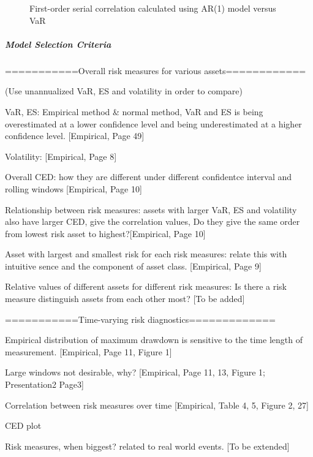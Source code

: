 \documentclass[11pt]{article}
\begin{document}
\begin{figure}[H]
\begin{minipage}[b]{0.48\textwidth}
    \caption{First-order serial correlation calculated using AR(1) model versus VaR}
    \label{fig:SerCol-VaR5yrAR1}
  \end{minipage}
\end{figure}

\subparagraph{Model Selection Criteria}




\newpage









\clearpage


===========Overall risk measures for various assets============

(Use unannualized VaR, ES and volatility in order to compare)

VaR, ES: Empirical method \& normal method, VaR and ES is being overestimated at a lower confidence level and being underestimated at a higher confidence level. [Empirical, Page 49]

Volatility: [Empirical, Page 8]

Overall CED: how they are different under different confidentce interval and rolling windows [Empirical, Page 10]

Relationship between risk measures: assets with larger VaR, ES and volatility also have larger CED, give the correlation values, Do they give the same order from lowest risk asset to highest?[Empirical, Page 10]

Asset with largest and smallest risk for each risk measures: relate this with intuitive sence and the component of asset class. [Empirical, Page 9]

Relative values of different assets for different risk measures: Is there a risk measure distinguish assets from each other most? [To be added]


===========Time-varying risk diagnostics=============

Empirical distribution of maximum drawdown is sensitive to the time length of measurement. [Empirical, Page 11, Figure 1]

Large windows not desirable, why? [Empirical, Page 11, 13, Figure 1; Presentation2 Page3]

Correlation between risk measures over time [Empirical, Table 4, 5, Figure 2, 27]

CED plot

Risk measures, when biggest? related to real world events. [To be extended]
\end{document}
